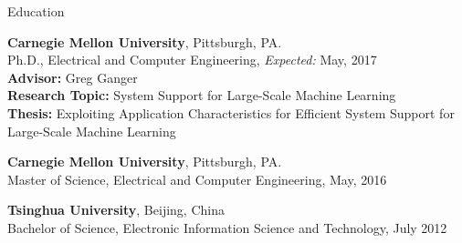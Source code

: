 \documentclass{resume} %
\begin{document}





\begin{rSection}{Education}

\textbf{Carnegie Mellon University}, Pittsburgh, PA.\\
Ph.D., Electrical and Computer Engineering, \hfill \emph{Expected:} May, 2017\\
\textbf{Advisor:} Greg Ganger\\
\textbf{Research Topic:} System Support for Large-Scale Machine Learning\\
\textbf{Thesis:} Exploiting Application Characteristics for Efficient System Support for Large-Scale Machine Learning

\textbf{Carnegie Mellon University}, Pittsburgh, PA.\\
Master of Science, Electrical and Computer Engineering, \hfill May, 2016

\textbf{Tsinghua University}, Beijing, China\\
Bachelor of Science, Electronic Information Science and Technology, \hfill July 2012


\end{rSection}
\end{document}
